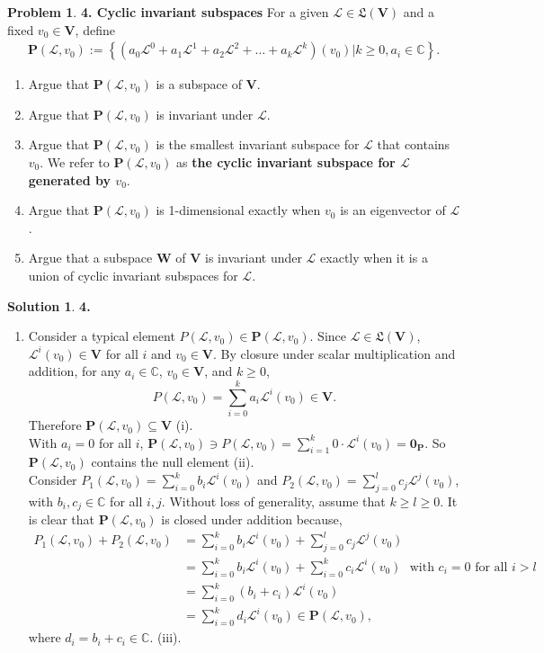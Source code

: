 \documentclass{article}
\theoremstyle{definition}
\newtheorem*{prob*}{Problem}
\newtheorem*{sln*}{Solution}
\newcommand{\V}{\mathbf{V}}
\newcommand{\W}{\mathbf{W}}
\newcommand{\lag}{\mathcal{L}}
\begin{document}
\newpage

\begin{prob*}\textbf{4. Cyclic invariant subspaces}
	For a given $\lag\in\mathfrak{L}(\V)$ and a fixed $v_0 \in \V$, define
	\begin{align*}
	\mathbf{P}(\lag,v_0) := \left\{ \left(a_0 \lag^0 + a_1\lag^1 + a_2\lag^2 + \dots + a_k \lag^k\right)(v_0)\bigg\vert k \geq 0, a_i \in \mathbb{C} \right\}.
	\end{align*}
	\begin{enumerate}
		\item Argue that $\mathbf{P}(\lag,v_0)$ is a subspace of $\V$.
		\item Argue that $\mathbf{P}(\lag,v_0)$ is invariant under $\lag$.
		\item Argue that $\mathbf{P}(\lag,v_0)$ is the smallest invariant subspace for $\lag$ that contains $v_0$. We refer to $\mathbf{P}(\lag,v_0)$ as \textbf{the cyclic invariant subspace for $\lag$ generated by $v_0$}.
		\item Argue that $\mathbf{P}(\lag,v_0)$ is 1-dimensional exactly when $v_0$ is an eigenvector of $\lag$.
		\item Argue that a subspace $\W$ of $\V$ is invariant under $\lag$ exactly when it is a union of cyclic invariant subspaces for $\lag$. 
	\end{enumerate}
	
	\begin{sln*}\textbf{4.}
		$\,$
		\begin{enumerate}
			\item Consider a typical element $P(\lag, v_0) \in \mathbf{P}(\lag,v_0) $. Since $\lag \in \mathfrak{L}(\V)$, $\lag^i(v_0) \in \V$ for all $i$ and $v_0 \in \V$. By closure under scalar multiplication and addition, for any $a_i\in \mathbb{C}$, $v_0\in \V$, and $k\geq 0$, $$ P(\lag, v_0) = \sum_{i=0}^k a_i \lag^i(v_0) \in \V.$$ Therefore $\mathbf{P}(\lag,v_0) \subseteq \V$ (i).\\
			
			With $a_i = 0$ for all $i$, $ \mathbf{P}(\lag,v_0) \ni P(\lag, v_0) = \sum^k_{i=1}0\cdot\lag^i(v_0) = \mathbf{0}_\mathbf{P}$. So $\mathbf{P}(\lag,v_0)$ contains the null element (ii).\\
			
			Consider $P_1(\lag, v_0) = \sum^k_{i=0}b_i\lag^i(v_0)$ and $P_2(\lag,v_0) = \sum^l_{j=0}c_j\lag^j(v_0)$, with $b_i, c_j \in \mathbb{C}$ for all $i,j$. Without loss of generality, assume that $k\geq l \geq 0$. It is clear that $\mathbf{P}(\lag,v_0)$ is closed under addition because, 
			\begin{align*}
			P_1(\lag,v_0) + P_2(\lag,v_0) &= \sum^k_{i=0}b_i\lag^i(v_0) + \sum^l_{j=0}c_j\lag^j(v_0)\\
			&= \sum^k_{i=0}b_i\lag^i(v_0) + \sum^k_{i=0}c_i\lag^i(v_0)\,\,\,\, \text{with }c_i = 0 \text{ for all } i > l\\
			&= \sum^k_{i=0}(b_i + c_i)\lag^i(v_0)\\ 
			&= \sum^k_{i=0}d_i\lag^i(v_0) \in \mathbf{P}(\lag,v_0),
			\end{align*}
			where $d_i = b_i + c_i \in \mathbb{C}$. (iii).\\ 
			

\end{enumerate}
\end{sln*}
\end{prob*}
\end{document}
